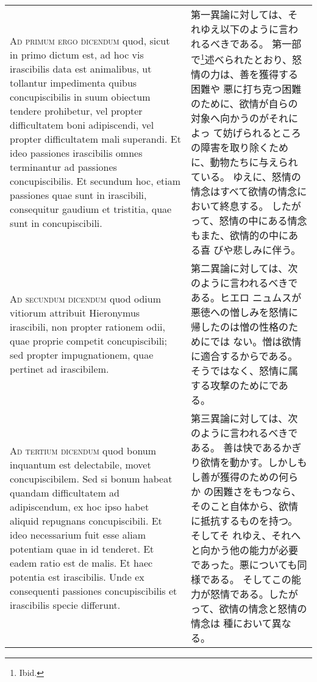 \documentclass[10pt]{jsarticle} %
\begin{document}
\begin{longtable}{p{21em}p{21em}}
\\



{\scshape Ad primum ergo dicendum} quod, sicut in primo dictum est, ad hoc vis
irascibilis data est animalibus, ut tollantur impedimenta quibus
concupiscibilis in suum obiectum tendere prohibetur, vel propter
difficultatem boni adipiscendi, vel propter difficultatem mali
superandi. Et ideo passiones irascibilis omnes terminantur ad passiones
concupiscibilis. Et secundum hoc, etiam passiones quae sunt in
irascibili, consequitur gaudium et tristitia, quae sunt in
concupiscibili.


&

第一異論に対しては、それゆえ以下のように言われるべきである。
第一部で\footnote{Ibid.}述べられたとおり、怒情の力は、善を獲得する困難や
悪に打ち克つ困難のために、欲情が自らの対象へ向かうのがそれによっ
 て妨げられるところの障害を取り除くために、動物たちに与えられている。
ゆえに、怒情の情念はすべて欲情の情念において終息する。
 したがって、怒情の中にある情念もまた、欲情的の中にある喜
 びや悲しみに伴う。


\\



{\scshape Ad secundum dicendum} quod odium vitiorum attribuit Hieronymus
irascibili, non propter rationem odii, quae proprie competit
concupiscibili; sed propter impugnationem, quae pertinet ad irascibilem.


&

第二異論に対しては、次のように言われるべきである。ヒエロ
 ニュムスが悪徳への憎しみを怒情に帰したのは憎の性格のためにでは
 ない。憎は欲情に適合するからである。そうではなく、怒情に属する攻撃のためにである。


\\



{\scshape Ad tertium dicendum} quod bonum inquantum est delectabile, movet
concupiscibilem. Sed si bonum habeat quandam difficultatem ad
adipiscendum, ex hoc ipso habet aliquid repugnans concupiscibili. Et
ideo necessarium fuit esse aliam potentiam quae in id tenderet. Et eadem
ratio est de malis. Et haec potentia est irascibilis. Unde ex
consequenti passiones concupiscibilis et irascibilis specie differunt.


&

第三異論に対しては、次のように言われるべきである。
善は快であるかぎり欲情を動かす。しかしもし善が獲得のための何らか
 の困難さをもつなら、そのこと自体から、欲情に抵抗するものを持つ。そしてそ
 れゆえ、それへと向かう他の能力が必要であった。悪についても同様である。
 そしてこの能力が怒情である。したがって、欲情の情念と怒情の情念は
 種において異なる。




\end{longtable}
\newpage
\end{document}
